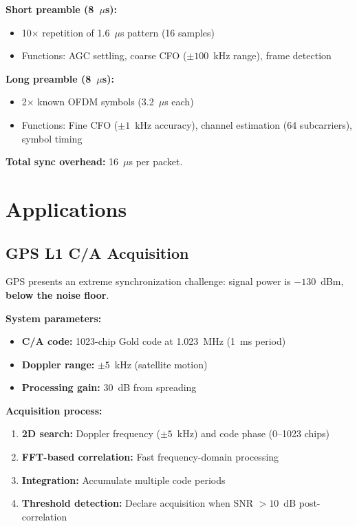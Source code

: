 \textbf{Short preamble (8~$\mu$s):}
\begin{itemize}
\item 10$\times$ repetition of 1.6~$\mu$s pattern (16 samples)
\item Functions: AGC settling, coarse CFO ($\pm 100$~kHz range), frame detection
\end{itemize}

\textbf{Long preamble (8~$\mu$s):}
\begin{itemize}
\item 2$\times$ known OFDM symbols (3.2~$\mu$s each)
\item Functions: Fine CFO ($\pm 1$~kHz accuracy), channel estimation (64 subcarriers), symbol timing
\end{itemize}

\textbf{Total sync overhead:} 16~$\mu$s per packet.

\section{Applications}

\subsection{GPS L1 C/A Acquisition}

GPS presents an extreme synchronization challenge: signal power is $-130$~dBm, \textbf{below the noise floor}.

\textbf{System parameters:}
\begin{itemize}
\item \textbf{C/A code:} 1023-chip Gold code at 1.023~MHz (1~ms period)
\item \textbf{Doppler range:} $\pm 5$~kHz (satellite motion)
\item \textbf{Processing gain:} 30~dB from spreading
\end{itemize}

\textbf{Acquisition process:}
\begin{enumerate}
\item \textbf{2D search:} Doppler frequency ($\pm 5$~kHz) and code phase (0--1023 chips)
\item \textbf{FFT-based correlation:} Fast frequency-domain processing
\item \textbf{Integration:} Accumulate multiple code periods
\item \textbf{Threshold detection:} Declare acquisition when SNR $> 10$~dB post-correlation
\end{enumerate}

